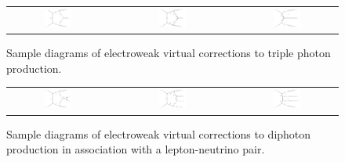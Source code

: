 \begin{figure}[t!]
  \begin{tabular}{ccccc}
    \includegraphics[width=0.288\textwidth]{diagrams/aaa_V_2} & &
    \includegraphics[width=0.288\textwidth]{diagrams/aaa_V_1} & &
    \includegraphics[width=0.288\textwidth]{diagrams/aaa_V_3} \\
  \end{tabular}
  \caption{
    Sample diagrams of electroweak virtual corrections to triple 
    photon production.
    \label{fig:aaa:amps}
  }
\end{figure}

\begin{figure}[t!]
  \begin{tabular}{ccccc}
    \includegraphics[width=0.288\textwidth]{diagrams/aaW_V_2} & &
    \includegraphics[width=0.288\textwidth]{diagrams/aaW_V_1} & &
    \includegraphics[width=0.288\textwidth]{diagrams/aaW_V_3} \\
  \end{tabular}
  \caption{
    Sample diagrams of electroweak virtual corrections to diphoton 
    production in association with a lepton-neutrino pair.
    \label{fig:aaw:amps}
  }
\end{figure}

